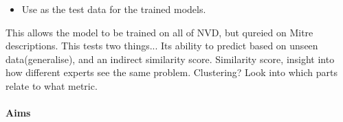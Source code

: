 \documentclass[11pt]{article}
\begin{document}
\begin{itemize}
	\item Use as the test data for the trained models.
\end{itemize}

This allows the model to be trained on all of NVD, but qureied on Mitre descriptions. This tests two
things... Its ability to predict based on unseen data(generalise), and an indirect similarity score.
Similarity score, insight into how different experts see the same problem.
Clustering? Look into which parts relate to what metric.



\paragraph{Aims}
\noindent
\end{document}
